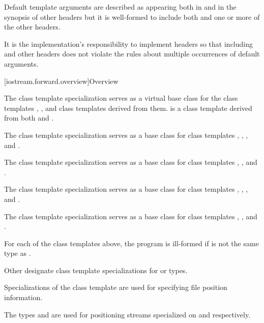 \pnum
Default template arguments are described as appearing both in
and in the synopsis of other headers
but it is well-formed to include both
and one or more of the other headers.
\begin{footnote}
It is the implementation's
responsibility to implement headers so
that including 
and other headers does not violate the rules about
multiple occurrences of default arguments.
\end{footnote}

[iostream.forward.overview]{Overview}

\pnum
The
class template specialization
serves as a virtual base class for the
class templates
,
,
and
class templates
derived from them.
is a class
template
derived from both
and
.

\pnum
The
class template specialization
serves as a base class for class templates
,
,
,
and
.

\pnum
The
class template specialization
serves as a base class for class templates
,
,
and
.

\pnum
The
class template specialization
serves as a base class for class templates
,
,
,
and
.

\pnum
The
class template specialization
serves as a base class for class templates
,
,
and
.

\pnum
\begin{note}
For each of the class templates above,
the program is ill-formed if
is not the same type as
.
\end{note}

\pnum
Other  designate
class template specializations for
or
types.

\pnum
Specializations of the class template
are
used for specifying file position information.
\begin{example}
The types
and
are used for positioning streams specialized on
and
respectively.
\end{example}

